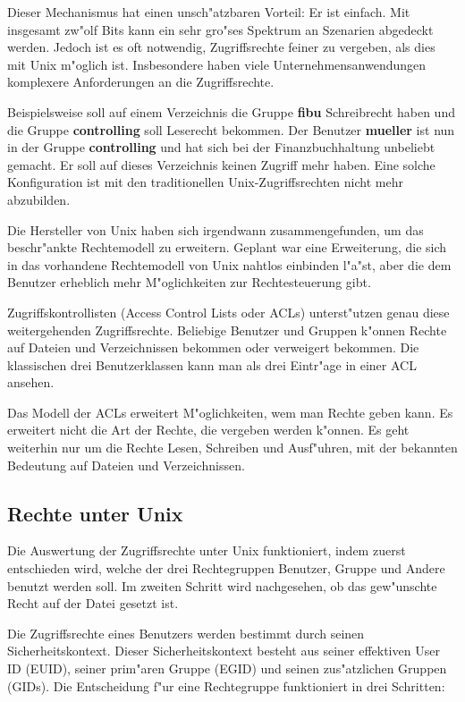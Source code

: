 \documentclass{scrartcl}\usepackage{pslatex}\typearea{12}
\newcommand{\username}{\textbf}
\begin{document}
Dieser Mechanismus hat einen unsch"atzbaren Vorteil: Er ist einfach.
Mit insgesamt zw"olf Bits kann ein sehr gro"ses Spektrum an Szenarien
abgedeckt werden. Jedoch ist es oft notwendig, Zugriffsrechte feiner
zu vergeben, als dies mit Unix m"oglich ist. Insbesondere haben viele
Unternehmensanwendungen komplexere Anforderungen an die
Zugriffsrechte.

Beispielsweise soll auf einem Verzeichnis die Gruppe \username{fibu}
Schreibrecht haben und die Gruppe \username{controlling} soll Leserecht
bekommen. Der Benutzer \username{mueller} ist nun in der Gruppe
\username{controlling} und hat sich bei der Finanzbuchhaltung unbeliebt
gemacht. Er soll auf dieses Verzeichnis keinen Zugriff mehr haben. Eine
solche Konfiguration ist mit den traditionellen Unix-Zugriffsrechten nicht
mehr abzubilden.

Die Hersteller von Unix haben sich irgendwann zusammengefunden, um das
beschr"ankte Rechtemodell zu erweitern. Geplant war eine Erweiterung, die
sich in das vorhandene Rechtemodell von Unix nahtlos einbinden l"a"st, aber
die dem Benutzer erheblich mehr M"oglichkeiten zur
Rechtesteuerung gibt.

Zugriffskontrollisten (Access Control Lists oder ACLs) unterst"utzen genau
diese weitergehenden Zugriffsrechte. Beliebige Benutzer und
Gruppen k"onnen Rechte auf Dateien und Verzeichnissen bekommen oder
verweigert bekommen. Die klassischen drei Benutzerklassen kann man als drei
Eintr"age in einer ACL ansehen.

Das Modell der ACLs erweitert M"oglichkeiten, wem man Rechte geben
kann. Es erweitert nicht die Art der Rechte, die vergeben werden
k"onnen. Es geht weiterhin nur um die Rechte Lesen, Schreiben und
Ausf"uhren, mit der bekannten Bedeutung auf Dateien und
Verzeichnissen.

\subsection{Rechte unter Unix}

Die Auswertung der Zugriffsrechte unter Unix funktioniert, indem
zuerst entschieden wird, welche der drei Rechtegruppen Benutzer,
Gruppe und Andere benutzt werden soll. Im zweiten Schritt wird
nachgesehen, ob das gew"unschte Recht auf der Datei gesetzt ist.

Die Zugriffsrechte eines Benutzers werden bestimmt durch seinen
Sicherheitskontext. Dieser Sicherheitskontext besteht aus seiner
effektiven User ID (EUID), seiner prim"aren Gruppe (EGID) und seinen
zus"atzlichen Gruppen (GIDs). Die Entscheidung f"ur eine Rechtegruppe
funktioniert in drei Schritten:
\end{document}
